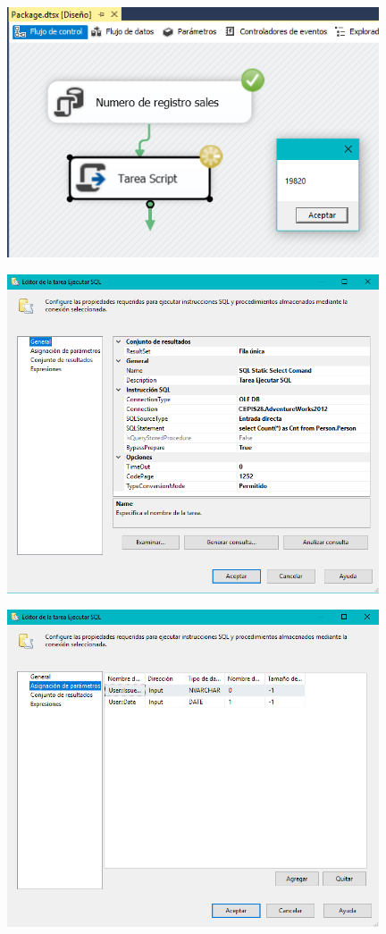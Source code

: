 	\begin{center}
	\includegraphics[width=11cm]{./Imagenes/img22}
	\end{center}	
	\begin{center}
	\includegraphics[width=11cm]{./Imagenes/img23}
	\end{center}	
	\begin{center}
	\includegraphics[width=11cm]{./Imagenes/img24}
	\end{center}	
